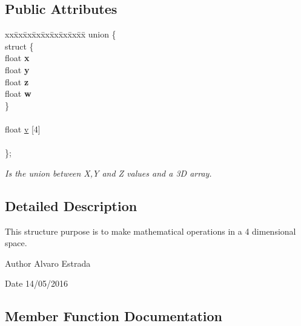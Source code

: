 \subsection*{Public Attributes}
\begin{DoxyCompactItemize}
\item 
\begin{tabbing}
xx\=xx\=xx\=xx\=xx\=xx\=xx\=xx\=xx\=\kill
union \{\\
\>struct \{\\
\>\>float {\bfseries x}\\
\>\>float {\bfseries y}\\
\>\>float {\bfseries z}\\
\>\>float {\bfseries w}\\
\>\} \hypertarget{unionae_core_1_1ae_vector4_d_1_1_0D30_a5d2f35cda09ba0321fc5c36c5080ab4b}{}\label{unionae_core_1_1ae_vector4_d_1_1_0D30_a5d2f35cda09ba0321fc5c36c5080ab4b}
\\
\>\>\\
\>float \hyperlink{structae_core_1_1ae_vector4_d_ab5082b764ce98edce266d75dad3bad1a}{v} \mbox{[}4\mbox{]}\\
\>\>\\
\}; \hypertarget{structae_core_1_1ae_vector4_d_a90ca45439a9f0960bc1924c249f11cc2}{}\label{structae_core_1_1ae_vector4_d_a90ca45439a9f0960bc1924c249f11cc2}
\\

\end{tabbing}\begin{DoxyCompactList}\small\item\em Is the union between X,Y and Z values and a 3D array. \end{DoxyCompactList}\end{DoxyCompactItemize}


\subsection{Detailed Description}
This structure purpose is to make mathematical operations in a 4 dimensional space. 

\begin{DoxyAuthor}{Author}
Alvaro Estrada 
\end{DoxyAuthor}
\begin{DoxyDate}{Date}
14/05/2016 
\end{DoxyDate}


\subsection{Member Function Documentation}
